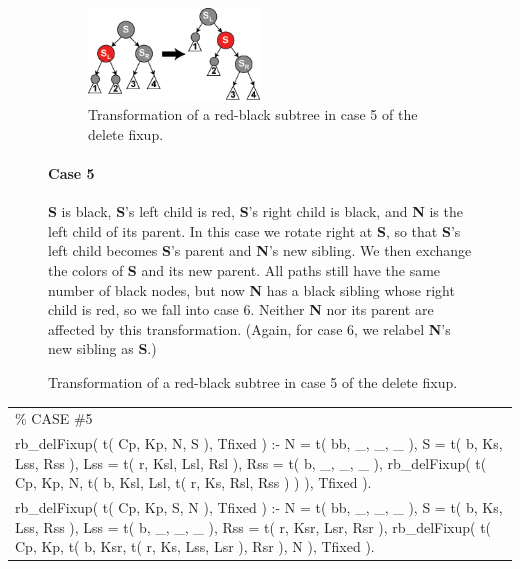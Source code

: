 \documentclass{article}
\newenvironment{code}{\obeycr\begin{it}\nopagebreak\addvspace{1ex}\noindent\footnotesize\begin{tabular}{|p{0.95\textwidth}|}\hline}{\\\hline\end{tabular}\par\addvspace{1ex}\end{it}\restorecr}
\begin{document}
\begin{figure}[h]
  \begin{figure}
    \includegraphics[width=0.5\textwidth]{Red-black_tree_delete_case_5}
    \caption{Transformation of a red-black subtree in case 5 of the delete fixup.}
    \label{delFix5}
  \end{figure}
  \paragraph{Case 5}
\textbf{S} is black, \textbf{S}'s left child is red, \textbf{S}'s right child is black, and \textbf{N} is the left child of its parent. In this case we rotate right at \textbf{S}, so that \textbf{S}'s left child becomes \textbf{S}'s parent and \textbf{N}'s new sibling. We then exchange the colors of \textbf{S} and its new parent. All paths still have the same number of black nodes, but now \textbf{N} has a black sibling whose right child is red, so we fall into case 6. Neither \textbf{N} nor its parent are affected by this transformation. (Again, for case 6, we relabel \textbf{N}'s new sibling as \textbf{S}.)
\end{figure}

\begin{code}
\% CASE \#5\\
rb\_delFixup( t( Cp, Kp, N, S ), Tfixed ) :-
\hspace{2ex}N = t( bb, \_, \_, \_ ),
\hspace{2ex}S = t( b, Ks, Lss, Rss ),
\hspace{2ex}Lss = t( r, Ksl, Lsl, Rsl ),
\hspace{2ex}Rss = t( b, \_, \_, \_ ),
\hspace{2ex}rb\_delFixup( t( Cp, Kp, N, t( b, Ksl, Lsl, t( r, Ks, Rsl, Rss ) ) ), Tfixed ).\\
rb\_delFixup( t( Cp, Kp, S, N ), Tfixed ) :-
\hspace{2ex}N = t( bb, \_, \_, \_ ),
\hspace{2ex}S = t( b, Ks, Lss, Rss ),
\hspace{2ex}Lss = t( b, \_, \_, \_ ),
\hspace{2ex}Rss = t( r, Ksr, Lsr, Rsr ),
\hspace{2ex}rb\_delFixup( t( Cp, Kp, t( b, Ksr, t( r, Ks, Lss, Lsr ), Rsr ), N ), Tfixed ).
\end{code}
\end{document}
